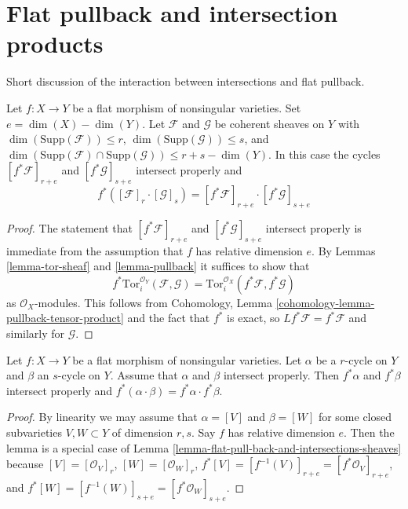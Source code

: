 \section{Flat pullback and intersection products}
\label{section-flat-pullback-and-intersection-products}

\noindent
Short discussion of the interaction between intersections and
flat pullback.

\begin{lemma}
\label{lemma-flat-pull-back-and-intersections-sheaves}
Let $f : X \to Y$ be a flat morphism of nonsingular varieties. Set
$e = \dim(X) - \dim(Y)$. Let $\mathcal{F}$ and $\mathcal{G}$ be coherent
sheaves on $Y$ with $\dim(\text{Supp}(\mathcal{F})) \leq r$,
$\dim(\text{Supp}(\mathcal{G})) \leq s$, and
$\dim(\text{Supp}(\mathcal{F}) \cap \text{Supp}(\mathcal{G}) )
\leq r + s - \dim(Y)$. In this case the cycles
$[f^*\mathcal{F}]_{r + e}$ and $[f^*\mathcal{G}]_{s + e}$
intersect properly and
$$
f^*([\mathcal{F}]_r \cdot [\mathcal{G}]_s) =
[f^*\mathcal{F}]_{r + e} \cdot [f^*\mathcal{G}]_{s + e}
$$
\end{lemma}

\begin{proof}
The statement that $[f^*\mathcal{F}]_{r + e}$ and $[f^*\mathcal{G}]_{s + e}$
intersect properly is immediate from the assumption that $f$ has
relative dimension $e$. By
Lemmas \ref{lemma-tor-sheaf} and \ref{lemma-pullback}
it suffices to show that
$$
f^*\text{Tor}_i^{\mathcal{O}_Y}(\mathcal{F}, \mathcal{G}) =
\text{Tor}_i^{\mathcal{O}_X}(f^*\mathcal{F}, f^*\mathcal{G})
$$
as $\mathcal{O}_X$-modules. This follows from
Cohomology, Lemma \ref{cohomology-lemma-pullback-tensor-product}
and the fact that $f^*$ is exact, so $Lf^*\mathcal{F} = f^*\mathcal{F}$
and similarly for $\mathcal{G}$.
\end{proof}

\begin{lemma}
\label{lemma-flat-pullback-and-intersections}
Let $f : X \to Y$ be a flat morphism of nonsingular varieties.
Let $\alpha$ be a $r$-cycle on $Y$ and $\beta$ an $s$-cycle on $Y$.
Assume that $\alpha$ and $\beta$ intersect properly. Then $f^*\alpha$
and $f^*\beta$ intersect properly and
$f^*( \alpha \cdot \beta ) = f^*\alpha \cdot f^*\beta$.
\end{lemma}

\begin{proof}
By linearity we may assume that $\alpha = [V]$ and $\beta = [W]$
for some closed subvarieties $V, W \subset Y$ of dimension $r, s$.
Say $f$ has relative dimension $e$. Then the lemma is a special case of
Lemma \ref{lemma-flat-pull-back-and-intersections-sheaves}
because $[V] = [\mathcal{O}_V]_r$, $[W] = [\mathcal{O}_W]_r$,
$f^*[V] = [f^{-1}(V)]_{r + e} = [f^*\mathcal{O}_V]_{r + e}$, and
$f^*[W] = [f^{-1}(W)]_{s + e} = [f^*\mathcal{O}_W]_{s + e}$.
\end{proof}


